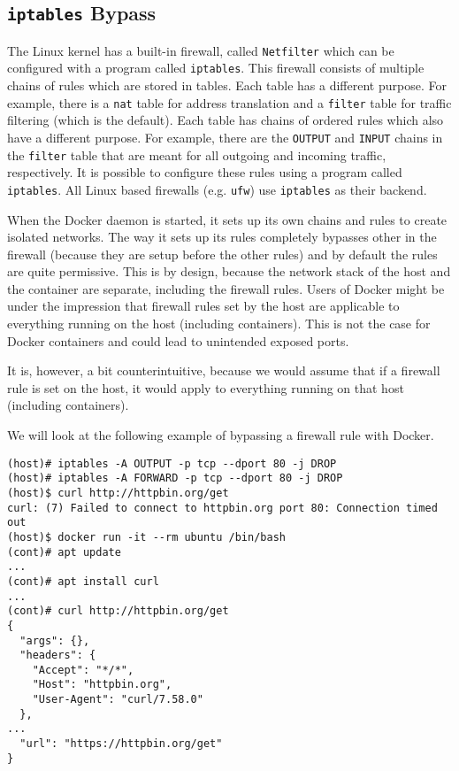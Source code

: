 \subsection{\texorpdfstring{\lstinline{iptables}}{iptables} Bypass}\label{subsection:iptables}
The Linux kernel has a built-in firewall, called \lstinline{Netfilter} which can be configured with a program called \lstinline{iptables}. This firewall consists of multiple chains of rules which are stored in tables. Each table has a different purpose. For example, there is a \lstinline{nat} table for address translation and a \lstinline{filter} table for traffic filtering (which is the default).
Each table has chains of ordered rules which also have a different purpose. For example, there are the \lstinline{OUTPUT} and \lstinline{INPUT} chains in the \lstinline{filter} table that are meant for all outgoing and incoming traffic, respectively.
It is possible to configure these rules using a program called \lstinline{iptables}. All Linux based firewalls (e.g. \lstinline{ufw}) use \lstinline{iptables} as their backend.

\medskip

When the Docker daemon is started, it sets up its own chains and rules to create isolated networks. The way it sets up its rules completely bypasses other in the firewall (because they are setup before the other rules) and by default the rules are quite permissive. This is by design, because the network stack of the host and the container are separate, including the firewall rules. Users of Docker might be under the impression that firewall rules set by the host are applicable to everything running on the host (including containers). This is not the case for Docker containers and could lead to unintended exposed ports.

It is, however, a bit counterintuitive, because we would assume that if a firewall rule is set on the host, it would apply to everything running on that host (including containers).

\medskip

We will look at the following example of bypassing a firewall rule with Docker.

\begin{lstlisting}[caption={Bypass \lstinline{iptables} firewall rules using Docker.},captionpos=b,label={listing:iptables-bypass}]
(host)# iptables -A OUTPUT -p tcp --dport 80 -j DROP
(host)# iptables -A FORWARD -p tcp --dport 80 -j DROP
(host)$ curl http://httpbin.org/get
curl: (7) Failed to connect to httpbin.org port 80: Connection timed out
(host)$ docker run -it --rm ubuntu /bin/bash
(cont)# apt update
...
(cont)# apt install curl
...
(cont)# curl http://httpbin.org/get
{
  "args": {},
  "headers": {
    "Accept": "*/*",
    "Host": "httpbin.org",
    "User-Agent": "curl/7.58.0"
  },
...
  "url": "https://httpbin.org/get"
}
\end{lstlisting}

